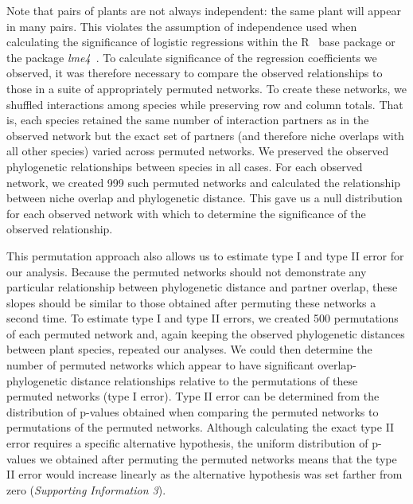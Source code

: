 \documentclass[12pt]{article}
\begin{document}
\begin{spacing}{1.5}
      Note that pairs of plants are not always independent: the same plant will 
      appear in many pairs. This violates the assumption of independence used 
      when calculating the significance of logistic regressions within 
      the R~\citep{R} base package or the package \emph{lme4}~\citep{lme4}. To 
      calculate significance of the regression coefficients we observed, it was 
      therefore necessary to compare the observed relationships to those in a 
      suite of appropriately permuted networks. To create these networks, we 
      shuffled interactions among species while preserving row and column 
      totals. That is, each species retained the same number of interaction 
      partners as in the observed network but the exact set of partners (and 
      therefore niche overlaps with all other species) varied across permuted 
      networks. We preserved the observed phylogenetic relationships between 
      species in all cases. For each observed network, we created 999 such 
      permuted networks and calculated the relationship between niche overlap 
      and phylogenetic distance. This gave us a null distribution for each 
      observed network with which to determine the significance of the observed 
      relationship.


      This permutation approach also allows us to estimate type I and type II 
      error for our analysis. Because the permuted networks should not demonstrate any particular relationship between phylogenetic distance and partner overlap, these slopes should be similar to those obtained after permuting these networks a second time.
      To estimate type I and type II errors, we created 500 permutations of each 
      permuted network and, again keeping the observed phylogenetic distances 
      between plant species, repeated our analyses. We could then determine the 
      number of permuted networks which appear to have significant 
      overlap-phylogenetic distance relationships relative to the permutations 
      of these permuted networks (type I error). Type II error can be determined
      from the distribution of p-values obtained when comparing the permuted 
      networks to permutations of the permuted networks. Although calculating 
      the exact type II error requires a specific alternative hypothesis, the 
      uniform distribution of p-values we obtained after permuting the permuted 
      networks means that the type II error would increase linearly as the 
      alternative hypothesis was set farther from zero (\emph{Supporting Information 3}).



\end{spacing}
\end{document}
